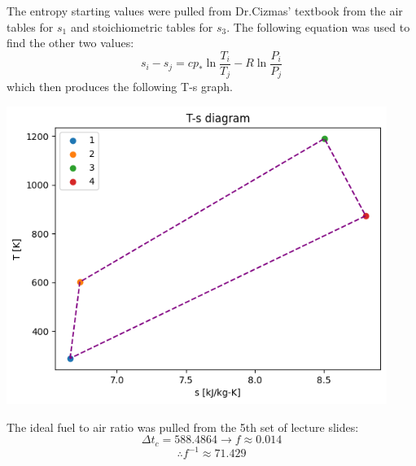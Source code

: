 \documentclass[12pt]{exam}
\begin{document}
\begin{questions}
\begin{solutionorbox}[\stretch{1}]
The entropy starting values were pulled from Dr.Cizmas' textbook from the 
air tables for \(s_1\) and stoichiometric tables for \(s_3\). The following equation
was used to find the other two values:
\[s_i - s_j = cp_*\ln{\frac{T_i}{T_j}} - R\ln{\frac{P_i}{P_j}}\]
which then produces the following T-s graph.
\begin{center}
\includegraphics[width=350pt]{t-s-graph.png}
\end{center}
The ideal fuel to air ratio was pulled from the 5th set of lecture slides:
\[\Delta{t_c} = 588.4864 \rightarrow f \approx 0.014\]
\[\therefore f^{-1} \approx 71.429\]

\end{solutionorbox}

\end{questions}
\end{document}
